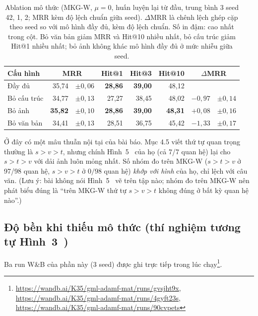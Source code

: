 \documentclass[conference]{IEEEtran}
\begin{document}
\begin{table}[t]
\caption{Ablation mô thức (MKG-W, $\mu=0$, huấn luyện lại từ đầu, trung bình 3 seed 42, 1, 2; MRR kèm độ lệch
chuẩn giữa seed). $\Delta$MRR là chênh lệch ghép cặp theo seed so với mô hình đầy đủ, kèm độ lệch chuẩn. Số in đậm:
cao nhất trong cột. Bỏ văn bản giảm MRR và Hit@10 nhiều nhất, bỏ cấu trúc giảm Hit@1 nhiều nhất; bỏ ảnh không
khác mô hình đầy đủ ở mức nhiễu giữa seed.}
\label{tab:abl}
\centering\footnotesize
\setlength{\tabcolsep}{2pt}
\begin{tabular}{lr@{\,}lrrrr@{\,}l}
\toprule
Cấu hình & \multicolumn{2}{c}{MRR} & Hit@1 & Hit@3 & Hit@10 & \multicolumn{2}{c}{$\Delta$MRR} \\
\midrule
Đầy đủ & 35,74 & ${\pm}0{,}06$ & \textbf{28,86} & \textbf{39,00} & 48,12 & & \\
Bỏ cấu trúc & 34,77 & ${\pm}0{,}13$ & 27,27 & 38,45 & 48,02 & $-0{,}97$ & ${\pm}0{,}14$ \\
Bỏ ảnh & \textbf{35,82} & ${\pm}0{,}10$ & \textbf{28,86} & \textbf{39,00} & \textbf{48,31} & $+0{,}08$ & ${\pm}0{,}16$ \\
Bỏ văn bản & 34,41 & ${\pm}0{,}13$ & 28,51 & 36,75 & 45,42 & $-1{,}33$ & ${\pm}0{,}17$ \\
\bottomrule
\end{tabular}
\end{table}

Ở đây có một mâu thuẫn nội tại của bài báo. Mục 4.5 viết thứ tự quan trọng thường là
$s > v > t$, nhưng chính Hình~5~\cite{adamfmat} của họ (cả 7/7 quan hệ) lại cho $s > t > v$ với dải
ảnh luôn mỏng nhất. Số nhóm đo trên MKG-W ($s > t > v$ ở 97/98 quan hệ, $s>v>t$ ở
$0/98$ quan hệ) \emph{khớp với hình} của họ, chỉ lệch với câu văn. (Lưu ý: bài
không nói Hình~5~\cite{adamfmat} vẽ trên tập nào; nhóm đo trên MKG-W nên phát biểu đúng là ``trên
MKG-W thứ tự $s>v>t$ không đúng ở bất kỳ quan hệ nào''.)

\subsection{Độ bền khi thiếu mô thức (thí nghiệm tương tự Hình~3~\cite{adamfmat})}
\noindent Ba run W\&B của phần này (3 seed) được ghi trực tiếp trong lúc chạy\footnote{\url{https://wandb.ai/K35/gml-adamf-mat/runs/gvsjht9x}, \url{https://wandb.ai/K35/gml-adamf-mat/runs/4gyft23s}, \url{https://wandb.ai/K35/gml-adamf-mat/runs/90cvpets}}.
\end{document}
